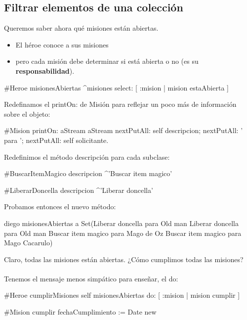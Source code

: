 \documentclass[a4paper,12pt]{book}
\begin{document}
\subsection{Filtrar elementos de una colección}
Queremos saber ahora qué misiones están abiertas.
\begin{itemize}
 \item El héroe conoce a sus misiones
 \item pero cada misión debe determinar si está abierta o no (es su \textbf{responsabilidad}). 
\end{itemize}

\begin{code}
#Heroe
misionesAbiertas
  ^misiones select: [ :mision | mision estaAbierta ] 
\end{code}

Redefinamos el printOn: de Misión para reflejar un poco más de información sobre el objeto:

\begin{code}
#Mision
printOn: aStream
   aStream nextPutAll: self descripcion;
		nextPutAll: ' para ';
		nextPutAll: self solicitante.
\end{code}

Redefinimos el método descripción para cada subclase:

\begin{code}
#BuscarItemMagico
descripcion
  ^'Buscar item magico'

#LiberarDoncella
descripcion
  ^'Liberar doncella'
\end{code}
  
Probamos entonces el nuevo método:

\begin{code}
diego misionesAbiertas
   a Set(Liberar doncella para Old man 
         Liberar doncella para Old man 
         Buscar item magico para Mago de Oz 
         Buscar item magico para Mago Cacarulo)
\end{code}

Claro, todas las misiones están abiertas. ¿Cómo cumplimos todas las misiones?
\\
\\
Tenemos el mensaje menos simpático para enseñar, el do:

\begin{code}
#Heroe
cumplirMisiones
  self misionesAbiertas do: [ :mision | mision cumplir ] 
  
#Mision
cumplir
  fechaCumplimiento := Date new
\end{code}
\end{document}
